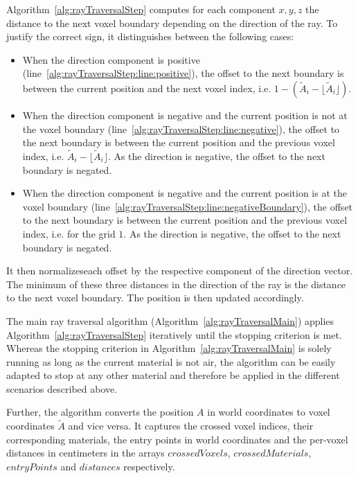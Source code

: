 Algorithm~\ref{alg:rayTraversalStep} computes for each component $x,y,z$ the
distance to the next voxel boundary depending on the direction of the ray. To
justify the correct sign, it distinguishes between the following cases:
\begin{itemize}
    \item When the direction component is positive (line~\ref{alg:rayTraversalStep:line:positive}), the offset to the next boundary is between the current position and the next voxel index, i.e. $1 - (\tilde{A}_i - \lfloor\tilde{A}_i\rfloor)$.
    \item When the direction component is negative and the current position is not at the voxel boundary (line~\ref{alg:rayTraversalStep:line:negative}), the offset to the next boundary is between the current position and the previous voxel index, i.e. $\tilde{A}_i - \lfloor\tilde{A}_i\rfloor$. As the direction is negative, the offset to the next boundary is negated.
    \item When the direction component is negative and the current position is at the voxel boundary (line~\ref{alg:rayTraversalStep:line:negativeBoundary}), the offset to the next boundary is between the current position and the previous voxel index, i.e. for the grid $1$. As the direction is negative, the offset to the next boundary is negated.
\end{itemize}

It then normalizeseach offset by the respective component of the direction
vector. The minimum of these three distances in the direction of the ray is the
distance to the next voxel boundary. The position is then updated accordingly.

The main ray traversal algorithm (Algorithm~\ref{alg:rayTraversalMain}) applies
Algorithm~\ref{alg:rayTraversalStep} iteratively until the stopping criterion is
met. Whereas the stopping criterion in Algorithm~\ref{alg:rayTraversalMain} is solely running as long as
the current material is not air, the algorithm can be easily adapted to stop at
any other material and therefore be applied in the different scenarios described
above.

Further, the algorithm converts the position $A$ in world coordinates to voxel
coordinates $\tilde{A}$ and vice versa. It captures the crossed voxel indices,
their corresponding materials, the entry points in world coordinates and the
per-voxel distances in centimeters in the arrays $crossedVoxels$,
$crossedMaterials$, $entryPoints$ and $distances$ respectively.

